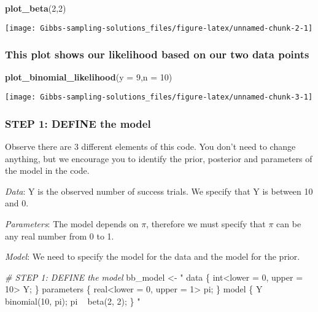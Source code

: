 \documentclass[
]{article}
\newenvironment{Shaded}{\begin{snugshade}}{\end{snugshade}}
\newcommand{\CommentTok}[1]{\textcolor[rgb]{0.56,0.35,0.01}{\textit{#1}}}
\newcommand{\DataTypeTok}[1]{\textcolor[rgb]{0.13,0.29,0.53}{#1}}
\newcommand{\DecValTok}[1]{\textcolor[rgb]{0.00,0.00,0.81}{#1}}
\newcommand{\KeywordTok}[1]{\textcolor[rgb]{0.13,0.29,0.53}{\textbf{#1}}}
\newcommand{\NormalTok}[1]{#1}
\newcommand{\StringTok}[1]{\textcolor[rgb]{0.31,0.60,0.02}{#1}}
\begin{document}
\begin{Shaded}
\begin{Highlighting}[]
\KeywordTok{plot_beta}\NormalTok{(}\DecValTok{2}\NormalTok{,}\DecValTok{2}\NormalTok{)}
\end{Highlighting}
\end{Shaded}

\texttt{[image: Gibbs-sampling-solutions\_files/figure-latex/unnamed-chunk-2-1]}

\hypertarget{this-plot-shows-our-likelihood-based-on-our-two-data-points}{%
\subsubsection{This plot shows our likelihood based on our two data
points}\label{this-plot-shows-our-likelihood-based-on-our-two-data-points}}

\begin{Shaded}
\begin{Highlighting}[]
\KeywordTok{plot_binomial_likelihood}\NormalTok{(}\DataTypeTok{y =} \DecValTok{9}\NormalTok{,}\DataTypeTok{n =} \DecValTok{10}\NormalTok{)}
\end{Highlighting}
\end{Shaded}

\texttt{[image: Gibbs-sampling-solutions\_files/figure-latex/unnamed-chunk-3-1]}

\hypertarget{step-1-define-the-model}{%
\subsubsection{STEP 1: DEFINE the model}\label{step-1-define-the-model}}

Observe there are 3 different elements of this code. You don't need to
change anything, but we encourage you to identify the prior, posterior
and parameters of the model in the code.

\emph{Data}: Y is the observed number of success trials. We specify that
Y is between 10 and 0.

\emph{Parameters}: The model depends on \(\pi\), therefore we must
specify that \(\pi\) can be any real number from 0 to 1.

\emph{Model}: We need to specify the model for the data and the model
for the prior.

\begin{Shaded}
\begin{Highlighting}[]
\CommentTok{# STEP 1: DEFINE the model}
\NormalTok{bb_model <-}\StringTok{ "}
\StringTok{  data \{}
\StringTok{    int<lower = 0, upper = 10> Y;}
\StringTok{  \}}
\StringTok{  parameters \{}
\StringTok{    real<lower = 0, upper = 1> pi;}
\StringTok{  \}}
\StringTok{  model \{}
\StringTok{    Y ~ binomial(10, pi);}
\StringTok{    pi ~ beta(2, 2);}
\StringTok{  \}}
\StringTok{"}
\end{Highlighting}
\end{Shaded}
\end{document}
